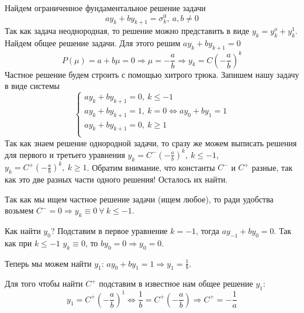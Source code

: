 \begin{example}
  Найдем ограниченное фундаментальное решение задачи
  \[ay_k+by_{k+1}=\sigma_k^0,\ a,b\neq0\]
  Так как задача неоднородная, то решение можно представить в виде
  $y_k=y_k^o+y_k^1$.
  Найдем общее решение задачи. Для этого решим $ay_k+by_{k+1}=0$
  \[P(\mu)=a+b\mu=0\Rightarrow\mu=-\frac{a}{b}\Rightarrow y_k=C\left(-\frac{a}{b}\right)^k\]
  Частное решение будем строить с помощью хитрого трюка. Запишем
  нашу задачу в виде системы
  \[\begin{cases}
      ay_k+by_{k+1}=0,\ k\leq -1                           \\
      ay_k+by_{k+1}=1,\ k =  0 \Leftrightarrow ay_0+by_1=1 \\
      ay_k+by_{k+1}=0,\ k \geq 1                           \\
    \end{cases}\]
  Так как знаем решение однородной задачи, то сразу
  же можем выписать решения для первого и третьего уравнения
  $y_k=C^-\left(-\frac{a}{b}\right)^k,\ k\leq -1$,
  $y_k=C^+\left(-\frac{a}{b}\right)^k,\ k\geq 1$.
  Обратим внимание, что константы $C^-$ и $C^+$ разные,
  так как это две разных части одного решения! Осталось их найти.

  Так как мы ищем частное решение задачи (ищем любое),
  то ради удобства возьмем $C^-=0\Rightarrow y_k\equiv 0\ \forall\ k\leq-1$.

  Как найти $y_0$? Подставим в первое уравнение $k=-1$, тогда
  $ay_{-1}+by_0=0$. Так как при $k\leq-1$ $y_k\equiv0$, то
  $by_0=0\Rightarrow y_0=0$.

  Теперь мы можем найти $y_1$: $ay_0+by_1=1\Rightarrow y_1=\frac{1}{b}$.

  Для того чтобы найти $C^+$ подставим
  в известное нам общее решение $y_1$:
  \[y_1=C^+\left(-\frac{a}{b}\right)^1\Leftrightarrow\frac{1}{b}=C^+\left(-\frac{a}{b}\right)\Rightarrow C^+=-\frac{1}{a}\]


\end{example}
